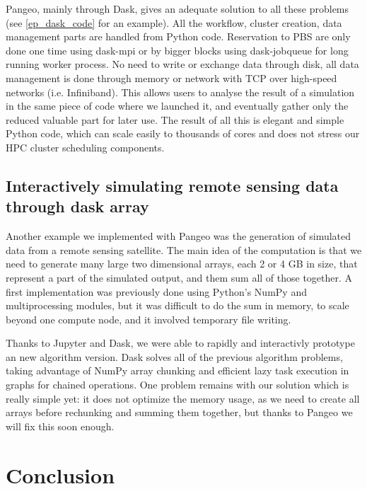 \documentclass{article}
\begin{document}
Pangeo, mainly through Dask, gives an adequate solution to all these problems (see \ref{ep_dask_code} for an example). All the workflow, cluster creation, data management parts are handled from Python code. Reservation to PBS are only done one time using dask-mpi or by bigger blocks using dask-jobqueue for long running worker process. No need to write or exchange data through disk, all data management is done through memory or network with TCP over high-speed networks (i.e. Infiniband). This allows users to analyse the result of a simulation in the same piece of code where we launched it, and eventually gather only the reduced valuable part for later use. The result of all this is elegant and simple Python code, which can scale easily to thousands of cores and does not stress our HPC cluster scheduling components.

\subsection{Interactively simulating remote sensing data through dask array}
\label{ssec:usecase2}

Another example we implemented with Pangeo was the generation of simulated data from a remote sensing satellite. The main idea of the computation is that we need to generate many large two dimensional arrays, each 2 or 4 GB in size, that represent a part of the simulated output, and them sum all of those together. A first implementation was previously done using Python's NumPy and multiprocessing modules, but it was difficult to do the sum in memory, to scale beyond one compute node, and it involved temporary file writing.

Thanks to Jupyter and Dask, we were able to rapidly and interactivly prototype an new algorithm version. Dask solves all of the previous algorithm problems, taking advantage of NumPy array chunking and efficient lazy task execution in graphs for chained operations. One problem remains with our solution which is really simple yet: it does not optimize the memory usage, as we need to create all arrays before rechunking and summing them together, but thanks to Pangeo we will fix this soon enough.

\section{Conclusion}
\label{sec:conclusion}
\end{document}

